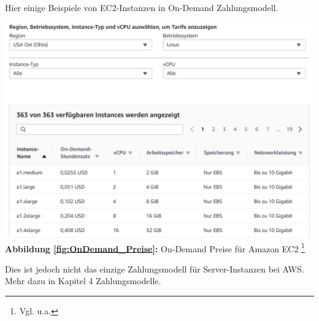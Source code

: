 Hier einige Beispiele von EC2-Instanzen in On-Demand Zahlungsmodell.

\begin{center}
      \includegraphics[scale=0.4]{sources/On-Demand-Pläne für Amazon EC2}\label{fig:OnDemand_Preise}\\
      \textbf{Abbildung \autoref{fig:OnDemand_Preise}:} On-Demand Preise für Amazon EC2
      \footnote{Vgl. u.a.\cite{AMZ01}}
\end{center}
Dies ist jedoch nicht das einzige Zahlungsmodell für Server-Instanzen bei AWS.
\\
 Mehr dazu in Kapitel 4 Zahlungsmodelle.
